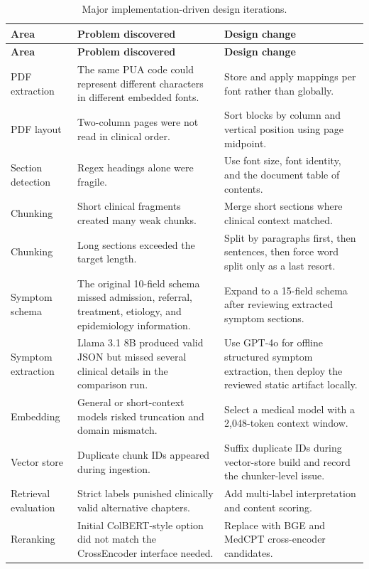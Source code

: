 \begin{longtable}{p{} p{} p{}}
\caption{Major implementation-driven design iterations.}
\label{tab:design_iterations}\\
\toprule
\textbf{Area} & \textbf{Problem discovered} & \textbf{Design change}\\
\midrule
\endfirsthead
\toprule
\textbf{Area} & \textbf{Problem discovered} & \textbf{Design change}\\
\midrule
\endhead
PDF extraction & The same PUA code could represent different characters in different embedded fonts. & Store and apply mappings per font rather than globally.\\
PDF layout & Two-column pages were not read in clinical order. & Sort blocks by column and vertical position using page midpoint.\\
Section detection & Regex headings alone were fragile. & Use font size, font identity, and the document table of contents.\\
Chunking & Short clinical fragments created many weak chunks. & Merge short sections where clinical context matched.\\
Chunking & Long sections exceeded the target length. & Split by paragraphs first, then sentences, then force word split only as a last resort.\\
Symptom schema & The original 10-field schema missed admission, referral, treatment, etiology, and epidemiology information. & Expand to a 15-field schema after reviewing extracted symptom sections.\\
Symptom extraction & Llama 3.1 8B produced valid JSON but missed several clinical details in the comparison run. & Use GPT-4o for offline structured symptom extraction, then deploy the reviewed static artifact locally.\\
Embedding & General or short-context models risked truncation and domain mismatch. & Select a medical model with a 2,048-token context window.\\
Vector store & Duplicate chunk IDs appeared during ingestion. & Suffix duplicate IDs during vector-store build and record the chunker-level issue.\\
Retrieval evaluation & Strict labels punished clinically valid alternative chapters. & Add multi-label interpretation and content scoring.\\
Reranking & Initial ColBERT-style option did not match the CrossEncoder interface needed. & Replace with BGE and MedCPT cross-encoder candidates.\\

\end{longtable}
